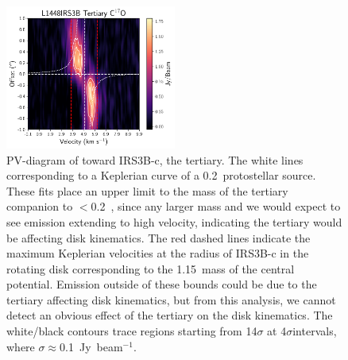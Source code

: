 \begin{figure}[H]
\begin{center}
\includegraphics[width=0.5\textwidth]{img/PV-Diagram_L1448IRS3B_C17O_image_taper1500k_image_tertiary31.pdf}
\end{center}
\caption{PV-diagram of \cso\space toward IRS3B-c, the tertiary. The white lines corresponding to a Keplerian curve of a 0.2~\solm\space protostellar source. These fits place an upper limit to the mass of the tertiary companion to $<$0.2~\solm, since any larger mass and we would expect to see emission extending to high velocity, indicating the tertiary would be affecting disk kinematics. The red dashed lines indicate the maximum Keplerian velocities at the radius of IRS3B-c in the rotating disk corresponding to the 1.15~\solm\space mass of the central potential. Emission outside of these bounds could be due to the tertiary affecting disk kinematics, but from this analysis, we cannot detect an obvious effect of the tertiary on the disk kinematics. The white/black contours trace regions starting from 14$\sigma$ at 4$\sigma$\space intervals, where $\sigma\approx$0.1~Jy~beam$^{-1}$.}\label{fig:l1448irs3b_c17o_pv_tert}
\end{figure}
